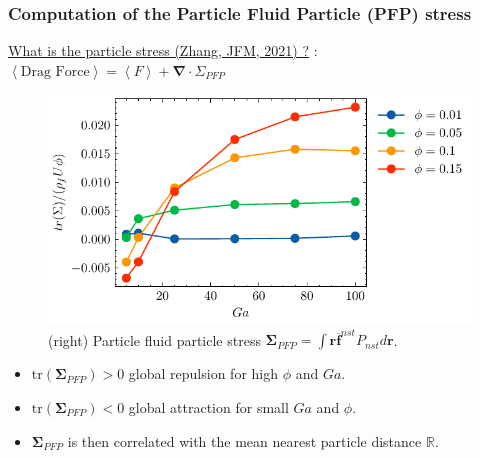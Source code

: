 \documentclass{sintefbeamer}
\newcommand{\avg}[1]{\left<#1\right>}
\newcommand{\nstavg}[1]{\overline{#1}^{nst}}
\newcommand{\nablab}{\bm{\nabla}}
\begin{document}
\begin{frame}
  \frametitle{Computation of the Particle Fluid Particle (PFP) stress}
  \underline{What is the particle stress (Zhang, JFM, 2021) ?}  
   : $\avg{\text{Drag Force}} = \avg{F} + \nablab \cdot \Sigma_{PFP}$
  \begin{figure}
    \includegraphics[height=0.23\textwidth]{image/HOMOGENEOUS/fPA/PFP.pdf}
    \caption{ 
      (right) Particle fluid particle stress $\mathbf{\Sigma}_{PFP} = \int \textbf{r}\nstavg{\textbf{f}} P_{nst}d\textbf{r}$.
      }
  \end{figure}
  
\begin{itemize}
  \item $\text{tr}(\mathbf{\Sigma}_{PFP}) > 0$ global repulsion for high $\phi$ and $Ga$. 
  \item $\text{tr}(\mathbf{\Sigma}_{PFP}) < 0$ global attraction for small $Ga$ and $\phi$.
  \item  $\mathbf{\Sigma}_{PFP}$ is then correlated with the mean nearest particle distance $\mathbb{R}$. 
\end{itemize}

\end{frame}
\end{document}
